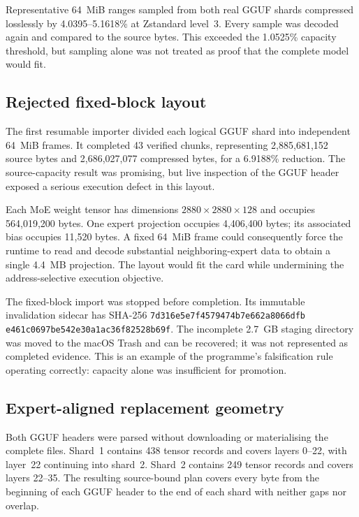 Representative 64~MiB ranges sampled from both real GGUF shards compressed
losslessly by 4.0395--5.1618\% at Zstandard level~3.  Every sample was decoded
again and compared to the source bytes.  This exceeded the 1.0525\% capacity
threshold, but sampling alone was not treated as proof that the complete model
would fit.

\subsection{Rejected fixed-block layout}

The first resumable importer divided each logical GGUF shard into independent
64~MiB frames.  It completed 43 verified chunks, representing 2,885,681,152
source bytes and 2,686,027,077 compressed bytes, for a 6.9188\% reduction.
The source-capacity result was promising, but live inspection of the GGUF
header exposed a serious execution defect in this layout.

Each MoE weight tensor has dimensions $2880\times2880\times128$ and occupies
564,019,200 bytes.  One expert projection occupies 4,406,400 bytes; its
associated bias occupies 11,520 bytes.  A fixed 64~MiB frame could consequently
force the runtime to read and decode substantial neighboring-expert data to
obtain a single 4.4~MB projection.  The layout would fit the card while
undermining the address-selective execution objective.

The fixed-block import was stopped before completion.  Its immutable
invalidation sidecar has SHA-256
\texttt{7d316e5e7f4579474b7e662a8066dfb}%
\allowbreak\texttt{e461c0697be542e30a1ac36f82528b69f}.
The incomplete 2.7~GB staging directory was moved to the macOS Trash and can be
recovered; it was not represented as completed evidence.  This is an example
of the programme's falsification rule operating correctly: capacity alone was
insufficient for promotion.

\subsection{Expert-aligned replacement geometry}

Both GGUF headers were parsed without downloading or materialising the complete
files.  Shard~1 contains 438 tensor records and covers layers 0--22, with
layer~22 continuing into shard~2.  Shard~2 contains 249 tensor records and
covers layers 22--35.  The resulting source-bound plan covers every byte from
the beginning of each GGUF header to the end of each shard with neither gaps
nor overlap.

